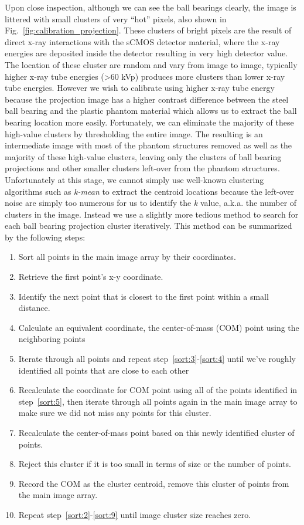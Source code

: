 Upon close inspection, although we can see the ball bearings clearly, the image is littered with small clusters of very ``hot'' pixels, also shown in Fig.~\ref{fig:calibration_projection}.  These clusters of bright pixels are the result of direct x-ray interactions with the sCMOS detector material, where the x-ray energies are deposited inside the detector resulting in very high detector value.  The location of these cluster are random and vary from image to image, typically higher x-ray tube energies (>60 kVp) produces more clusters than lower x-ray tube energies.  However we wish to calibrate using higher x-ray tube energy because the projection image has a higher contrast difference between the steel ball bearing and the plastic phantom material which allows us to extract the ball bearing location more easily.  Fortunately, we can eliminate the majority of these high-value clusters by thresholding the entire image.  The resulting is an intermediate image with most of the phantom structures removed as well as the majority of these high-value clusters, leaving only the clusters of ball bearing projections and other smaller clusters left-over from the phantom structures.  Unfortunately at this stage, we cannot simply use well-known clustering algorithms such as \textit{k-mean} to extract the centroid locations because the left-over noise are simply too numerous for us to identify the \textit{k} value, a.k.a. the number of clusters in the image.  Instead we use a slightly more tedious method to search for each ball bearing projection cluster iteratively.  This method can be summarized by the following steps:
\begin{enumerate}
\item \label{sort:1} Sort all points in the main image array by their coordinates.
\item \label{sort:2} Retrieve the first point's x-y coordinate.
\item \label{sort:3} Identify the next point that is closest to the first point within a small distance.
\item \label{sort:4} Calculate an equivalent coordinate, the center-of-mass (COM) point using the neighboring points
\item \label{sort:5} Iterate through all points and repeat step~\ref{sort:3}-\ref{sort:4} until we've roughly identified all points that are close to each other
\item \label{sort:6} Recalculate the coordinate for COM point using all of the points identified in step~\ref{sort:5}, then iterate through all points again in the main image array to make sure we did not miss any points for this cluster.
\item \label{sort:7} Recalculate the center-of-mass point based on this newly identified cluster of points.
\item \label{sort:8} Reject this cluster if it is too small in terms of size or the number of points.
\item \label{sort:9} Record the COM as the cluster centroid, remove this cluster of points from the main image array.
\item \label{sort:10} Repeat step~\ref{sort:2}-\ref{sort:9} until image cluster size reaches zero.
\end{enumerate}

